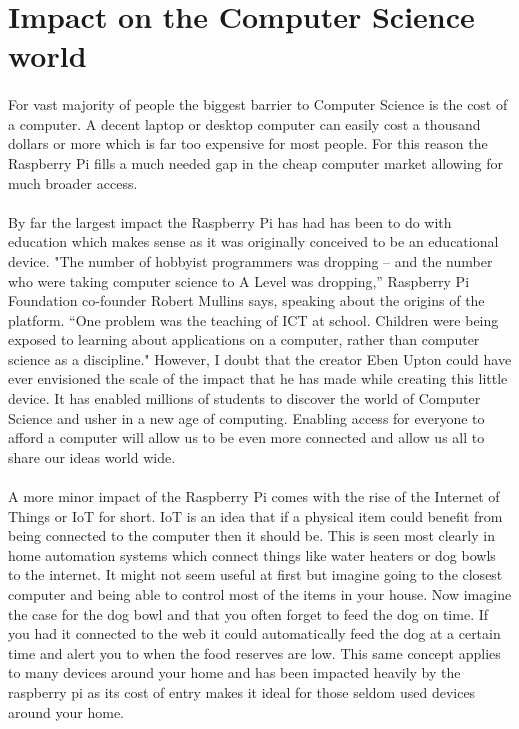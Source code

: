 \documentclass[
10pt, %
a4paper, %
oneside, %
headinclude,footinclude, %
BCOR5mm, %
]{scrartcl}
\begin{document}
\section{Impact on the Computer Science world}

\paragraph{}
For vast majority of people the biggest barrier to Computer Science is the cost of a computer.
A decent laptop or desktop computer can easily cost a thousand dollars or more which is far too expensive for most people.
For this reason the Raspberry Pi fills a much needed gap in the cheap computer market allowing for much broader access.
\paragraph{}
By far the largest impact the Raspberry Pi has had has been to do with education which makes sense as it was originally conceived to be an educational device.
"The number of hobbyist programmers
was dropping – and the number who were
taking computer science to A Level was
dropping,” Raspberry Pi Foundation
co-founder Robert Mullins says, speaking
about the origins of the platform. “One
problem was the teaching of ICT at school.
Children were being exposed to learning
about applications on a computer, rather
than computer science as a discipline." \cite{chrisedwards2016}
However, I doubt that the creator Eben Upton could have ever envisioned the scale of the impact that he has made while creating this little device.
It has enabled millions of students to discover the world of Computer Science and usher in a new age of computing.
Enabling access for everyone to afford a computer will allow us to be even more connected and allow us all to share our ideas world wide.

\paragraph{}
A more minor impact of the Raspberry Pi comes with the rise of the Internet of Things or IoT for short.
IoT is an idea that if a physical item could benefit from being connected to the computer then it should be.
This is seen most clearly in home automation systems which connect things like water heaters or dog bowls to the internet.
It might not seem useful at first but imagine going to the closest computer and being able to control most of the items in your house.
Now imagine the case for the dog bowl and that you often forget to feed the dog on time.
If you had it connected to the web it could automatically feed the dog at a certain time and alert you to when the food reserves are low.
This same concept applies to many devices around your home and has been impacted heavily by the raspberry pi as its cost of entry makes it ideal for those seldom used devices around your home.
\end{document}
